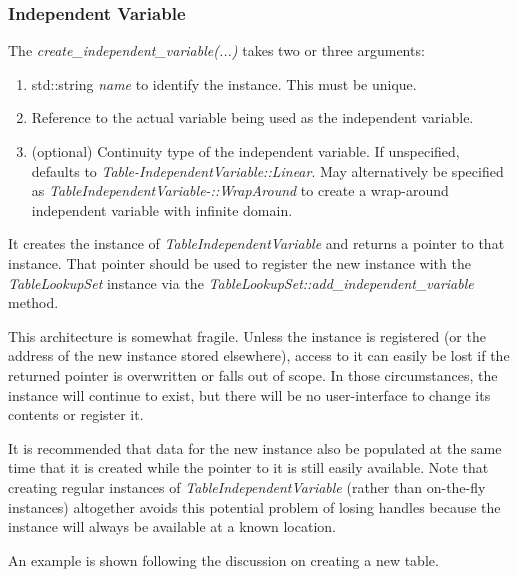 \documentclass[11pt,fleqn]{report}
\begin{document}
\subsubsection{Independent Variable}
The \textit{create\_independent\_variable(...)} takes two or three arguments:
\begin{enumerate}
 \item std::string \textit{name} to identify the instance.
  This must be unique.
 \item Reference to the actual variable being used as the independent variable.
 \item (optional) Continuity type of the independent variable.
  If unspecified, defaults to \textit{Table-IndependentVariable::Linear}.
  May alternatively be
  specified as \textit{TableIndependentVariable-::WrapAround}
  to create a wrap-around independent variable with infinite domain.
\end{enumerate}

 It creates the
 instance of \textit{TableIndependentVariable} and returns a pointer to that
 instance.  That pointer should be used to register the new instance with the
 \textit{TableLookupSet} instance via the
 \textit{TableLookupSet::add\_independent\_variable} method.

 This architecture is somewhat fragile.  Unless the instance is registered
 (or the address of the new instance stored elsewhere), access to it can
 easily be lost if the returned pointer is overwritten or falls out of scope.
 In those circumstances, the instance will continue to exist, but there will
 be no user-interface to change its contents or register it.

It is recommended that data for the new instance also be populated at the
same time
that it is created while the pointer to it is still easily available.
Note that creating regular instances of \textit{TableIndependentVariable}
(rather than on-the-fly instances) altogether avoids this potential problem of
losing handles because the instance will always be available at a known
location.

An example is shown following the discussion on creating a new table.
\end{document}
